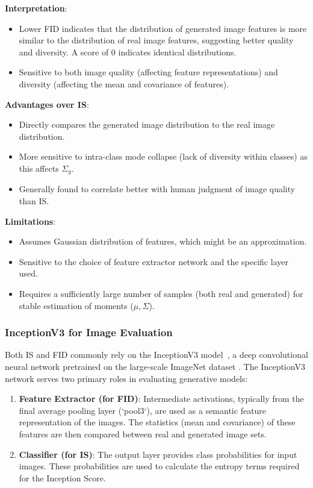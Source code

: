 \noindent\textbf{Interpretation}:
\begin{itemize}
    \item Lower FID indicates that the distribution of generated image features is more similar to the distribution of real image features, suggesting better quality and diversity. A score of 0 indicates identical distributions.
    \item Sensitive to both image quality (affecting feature representations) and diversity (affecting the mean and covariance of features).
\end{itemize}

\textbf{Advantages over IS}:
\begin{itemize}
    \item Directly compares the generated image distribution to the real image distribution.
    \item More sensitive to intra-class mode collapse (lack of diversity within classes) as this affects \(\Sigma_g\).
    \item Generally found to correlate better with human judgment of image quality than IS.
\end{itemize}

\textbf{Limitations}:
\begin{itemize}
    \item Assumes Gaussian distribution of features, which might be an approximation.
    \item Sensitive to the choice of feature extractor network and the specific layer used.
    \item Requires a sufficiently large number of samples (both real and generated) for stable estimation of moments (\(\mu, \Sigma\)).
\end{itemize}

\subsubsection[InceptionV3 Model]{InceptionV3 for Image Evaluation}

Both IS and FID commonly rely on the InceptionV3 model~\cite{szegedy2016rethinking}, a deep convolutional neural network pretrained on the large-scale ImageNet dataset \cite{ImageNetDataset5206848}. The InceptionV3 network serves two primary roles in evaluating generative models:

\begin{enumerate}
    \item \textbf{Feature Extractor (for FID)}: Intermediate activations, typically from the final average pooling layer (`pool3`), are used as a semantic feature representation of the images. The statistics (mean and covariance) of these features are then compared between real and generated image sets.
    \item \textbf{Classifier (for IS)}: The output layer provides class probabilities for input images. These probabilities are used to calculate the entropy terms required for the Inception Score.
\end{enumerate}

